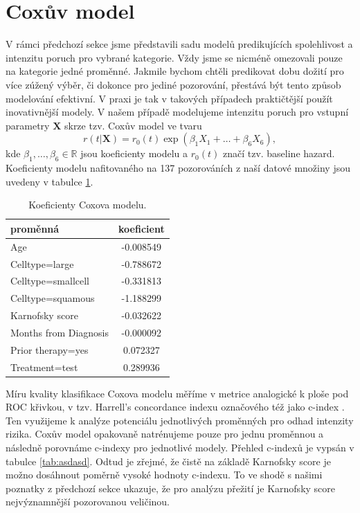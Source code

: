 \documentclass[10pt]{article}
\begin{document}
  
\newpage


\section{Coxův model}
V rámci předchozí sekce jsme představili sadu modelů predikujících spolehlivost a intenzitu poruch pro vybrané kategorie. Vždy jsme se nicméně omezovali pouze na kategorie jedné proměnné. Jakmile bychom chtěli predikovat dobu dožití pro více zúžený výběr, či dokonce pro jediné pozorování, přestává být tento způsob modelování efektivní. V praxi je tak v takových případech praktičtější použít inovativnější modely. V našem případě modelujeme intenzitu poruch pro vstupní parametry $\textbf{X}$ skrze tzv. Coxův model \cite{cox} ve tvaru
\begin{equation}\label{cox}
r(t\vert \textbf{X}) = r_0(t)\exp(\beta_1X_1 + \dots + \beta_6X_6),
\end{equation}
kde $\beta_1,\dots,\beta_6 \in \mathbb{R} $ jsou koeficienty modelu a $r_0(t)$ značí tzv. baseline hazard. Koeficienty modelu nafitovaného na 137 pozorováních z naší datové množiny jsou uvedeny v tabulce \ref{tab:asdasssd}.
\begin{table}[htb!]
\centering
\begin{tabular}{lc}
proměnná & koeficient \\ 
 \toprule
Age         &   -0.008549 \\
Celltype=large       &   -0.788672 \\
Celltype=smallcell   &   -0.331813 \\
Celltype=squamous    &   -1.188299 \\
Karnofsky score      &   -0.032622 \\
Months from Diagnosis  & -0.000092  \\
Prior therapy=yes    &    0.072327 \\
Treatment=test       &    0.289936 
\end{tabular}
\caption{Koeficienty Coxova modelu.}\label{tab:asdasssd}
\end{table}
Míru kvality klasifikace Coxova modelu měříme v metrice analogické k ploše pod ROC křivkou, v tzv. Harrell's concordance indexu označového též jako c-index \cite{cox}. Ten využijeme k analýze potenciálu jednotlivých proměnných pro odhad intenzity rizika. Coxův model opakovaně natrénujeme pouze pro jednu proměnnou a následně porovnáme c-indexy pro jednotlivé modely. Přehled c-indexů je vypsán v tabulce \ref{tab:asdasd}. Odtud je zřejmé, že čistě na základě Karnofsky score je možno dosáhnout poměrně vysoké hodnoty c-indexu. To ve shodě s našimi poznatky z předchozí sekce ukazuje, že pro analýzu přežití je Karnofsky score nejvýznamnější pozorovanou veličinou. 
\end{document}
